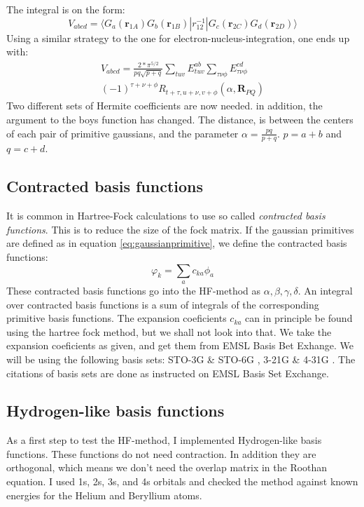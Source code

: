 \documentclass[a4paper,10pt, twocolumn, pre]{revtex4}
\newcommand{\rvec}{\mathbf{r}}
\newcommand{\mb}{\mathbf}
\newcommand{\sandwich}[3]{\langle {#1}|{#2}|{#3}\rangle}
\begin{document}
The integral is on the form:
\begin{equation}
	V_{abcd} = \sandwich{G_a(\rvec_{1A})G_b(\rvec_{1B})}{r_{12}^{-1}}{G_c(\rvec_{2C})G_d(\rvec_{2D})}
\end{equation}
Using a similar strategy to the one for electron-nucleus-integration, one ends up with:
\begin{align}
	V_{abcd} = \frac{2*\pi^{5/2}}{pq\sqrt{p+q}} \sum_{tuv}E_{tuv}^{ab}\sum_{\tau\nu\phi}E_{\tau\nu\phi}^{cd} \nonumber\\
	(-1)^{\tau+\nu+\phi}R_{t+\tau, u+\nu, v+\phi}(\alpha, \mb{R}_{PQ})
\end{align}
Two different sets of Hermite coefficients are now needed. in addition, the argument to the boys function has changed. The distance, is between the centers of each pair of primitive gaussians, and the parameter $\alpha = \frac{pq}{p+q}$. $p = a+b$ and $q = c+d$.

\subsection{Contracted basis functions}
It is common in Hartree-Fock calculations to use so called \emph{contracted basis functions}. This is to reduce the size of the fock matrix. If the gaussian primitives are defined as in equation \ref{eq:gaussianprimitive}, we define the contracted basis functions:
\begin{equation}
	\varphi_k = \sum_a c_{ka} \phi_a
\end{equation}
These contracted basis functions go into the HF-method as $\alpha, \beta, \gamma, \delta$. An integral over contracted basis functions is a sum of integrals of the corresponding primitive basis functions. The expansion coeficients $c_{ka}$ can in principle be found using the hartree fock method, but we shall not look into that. We take the expansion coeficients as given, and get them from EMSL Basis Bet Exhange\cite{Schuchardt2007}. We will be using the following basis sets: STO-3G \& STO-6G \cite{Hehre1969,Hehre1970}, 3-21G \& 4-31G \cite{Krishnan1980,gordon1982basis}. The citations of basis sets are done as instructed on EMSL Basis Set Exchange.

\subsection{Hydrogen-like basis functions}
As a first step to test the HF-method, I implemented Hydrogen-like basis functions. These functions do not need contraction. In addition they are orthogonal, which means we don't need the overlap matrix in the Roothan equation. I used 1s, 2s, 3s, and 4s orbitals and checked the method against known energies for the Helium and Beryllium atoms. 
\end{document}
